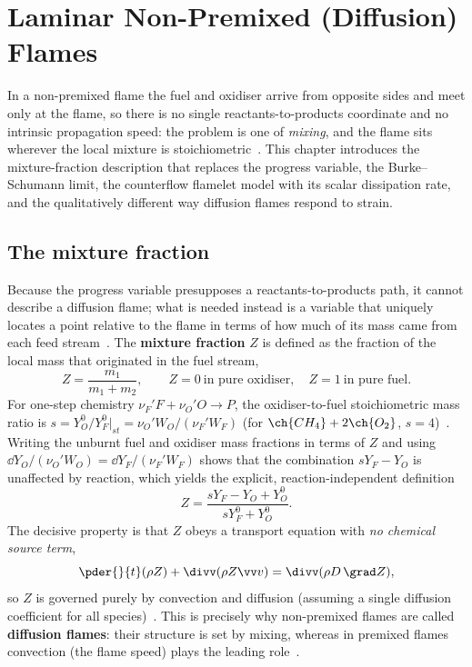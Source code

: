 \chapter{Laminar Non-Premixed (Diffusion) Flames}\label{ch:nonpremixed}

In a non-premixed flame the fuel and oxidiser arrive from opposite sides and meet only at the flame, so there is no single reactants-to-products coordinate and no intrinsic propagation speed: the problem is one of \emph{mixing}, and the flame sits wherever the local mixture is stoichiometric~\cite{lecture9,transcript_l9}. This chapter introduces the mixture-fraction description that replaces the progress variable, the Burke--Schumann limit, the counterflow flamelet model with its scalar dissipation rate, and the qualitatively different way diffusion flames respond to strain.

\section{The mixture fraction}

Because the progress variable presupposes a reactants-to-products path, it cannot describe a diffusion flame; what is needed instead is a variable that uniquely locates a point relative to the flame in terms of how much of its mass came from each feed stream~\cite{lecture9,transcript_l9}. The \textbf{mixture fraction} $Z$ is defined as the fraction of the local mass that originated in the fuel stream,
\begin{equation}
Z=\frac{m_1}{m_1+m_2},\qquad Z=0\ \text{in pure oxidiser},\quad Z=1\ \text{in pure fuel}.
\label{eq:Zdef}
\end{equation}
For one-step chemistry $\nu_F' F+\nu_O' O\rightarrow P$, the oxidiser-to-fuel stoichiometric mass ratio is $s=Y_O^0/Y_F^0\big|_{st}=\nu_O' W_O/(\nu_F' W_F)$ (for $\ch{CH_4}+2\ch{O_2}$, $s=4$)~\cite{lecture9}. Writing the unburnt fuel and oxidiser mass fractions in terms of $Z$ and using $\dd Y_O/(\nu_O' W_O)=\dd Y_F/(\nu_F' W_F)$ shows that the combination $sY_F-Y_O$ is unaffected by reaction, which yields the explicit, reaction-independent definition
\begin{equation}
Z=\frac{sY_F-Y_O+Y_O^0}{sY_F^0+Y_O^0}.
\label{eq:Z-twostream}
\end{equation}
The decisive property is that $Z$ obeys a transport equation with \emph{no chemical source term},
\begin{equation}
\pder{}{t}(\rho Z)+\divv(\rho Z\vv v)=\divv(\rho D\,\grad Z),
\label{eq:Z-transport}
\end{equation}
so $Z$ is governed purely by convection and diffusion (assuming a single diffusion coefficient for all species)~\cite{lecture9}. This is precisely why non-premixed flames are called \textbf{diffusion flames}: their structure is set by mixing, whereas in premixed flames convection (the flame speed) plays the leading role~\cite{transcript_l9}.

